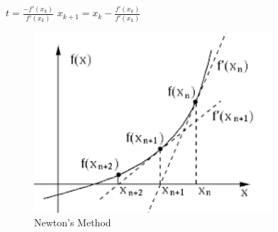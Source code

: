 \documentclass[11pt, oneside]{article}   	%
\begin{document}
$t = \frac{-f'(x_k)}{f'(x_k)}$ \hspace{1mm} $x_{k+1} = x_k - \frac{f'(x_k)}{f'(x_k)}$


\begin{figure}[htbp] %
   \centering
   \includegraphics[width=3.5in]{nm.png} 
   \caption{Newton's Method}
\end{figure}
\end{document}
